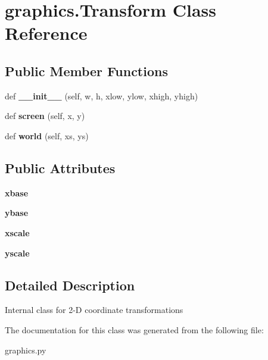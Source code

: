 \hypertarget{classgraphics_1_1_transform}{}\section{graphics.\+Transform Class Reference}
\label{classgraphics_1_1_transform}
\subsection*{Public Member Functions}
\begin{DoxyCompactItemize}
\item 
\mbox{\label{classgraphics_1_1_transform_a826600468986f5938247b1a09dc89097}} 
def {\bfseries \+\_\+\+\_\+init\+\_\+\+\_\+} (self, w, h, xlow, ylow, xhigh, yhigh)
\item 
\mbox{\label{classgraphics_1_1_transform_a52ce3f42703299dcf57d65dbdf856ccc}} 
def {\bfseries screen} (self, x, y)
\item 
\mbox{\label{classgraphics_1_1_transform_adaa57283f32d487d122a5cae919ce1e8}} 
def {\bfseries world} (self, xs, ys)
\end{DoxyCompactItemize}
\subsection*{Public Attributes}
\begin{DoxyCompactItemize}
\item 
\mbox{\label{classgraphics_1_1_transform_af43d705e45fda80627425215440a0394}} 
{\bfseries xbase}
\item 
\mbox{\label{classgraphics_1_1_transform_a56bedbb5d2c98e6bf4f1ac28b77688d5}} 
{\bfseries ybase}
\item 
\mbox{\label{classgraphics_1_1_transform_aa5d63ba571985d5d70ee661b7e84646f}} 
{\bfseries xscale}
\item 
\mbox{\label{classgraphics_1_1_transform_aad8322957fc2e0f6b445440f04150c1d}} 
{\bfseries yscale}
\end{DoxyCompactItemize}


\subsection{Detailed Description}
\begin{DoxyVerb}Internal class for 2-D coordinate transformations\end{DoxyVerb}
 

The documentation for this class was generated from the following file\+:\begin{DoxyCompactItemize}
\item 
graphics.\+py\end{DoxyCompactItemize}
